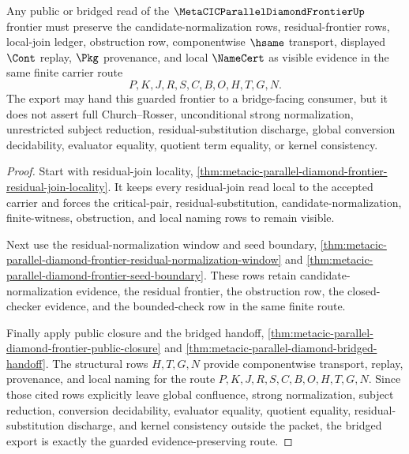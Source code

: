 \begin{theorem}
\label{thm:metacic-parallel-diamond-frontier-bridged-export}
Any public or bridged read of the $\MetaCICParallelDiamondFrontierUp$ frontier must preserve the candidate-normalization rows, residual-frontier rows, local-join ledger, obstruction row, componentwise $\hsame$ transport, displayed $\Cont$ replay, $\Pkg$ provenance, and local $\NameCert$ as visible evidence in the same finite carrier route
$$
P,K,J,R,S,C,B,O,H,T,G,N.
$$
The export may hand this guarded frontier to a bridge-facing consumer, but it does not assert full Church--Rosser, unconditional strong normalization, unrestricted subject reduction, residual-substitution discharge, global conversion decidability, evaluator equality, quotient term equality, or kernel consistency.
\end{theorem}
\begin{proof}
Start with residual-join locality, \autoref{thm:metacic-parallel-diamond-frontier-residual-join-locality}. It keeps every residual-join read local to the accepted carrier and forces the critical-pair, residual-substitution, candidate-normalization, finite-witness, obstruction, and local naming rows to remain visible.

Next use the residual-normalization window and seed boundary, \autoref{thm:metacic-parallel-diamond-frontier-residual-normalization-window} and \autoref{thm:metacic-parallel-diamond-frontier-seed-boundary}. These rows retain candidate-normalization evidence, the residual frontier, the obstruction row, the closed-checker evidence, and the bounded-check row in the same finite route.

Finally apply public closure and the bridged handoff, \autoref{thm:metacic-parallel-diamond-frontier-public-closure} and \autoref{thm:metacic-parallel-diamond-bridged-handoff}. The structural rows $H,T,G,N$ provide componentwise transport, replay, provenance, and local naming for the route $P,K,J,R,S,C,B,O,H,T,G,N$. Since those cited rows explicitly leave global confluence, strong normalization, subject reduction, conversion decidability, evaluator equality, quotient equality, residual-substitution discharge, and kernel consistency outside the packet, the bridged export is exactly the guarded evidence-preserving route.
\end{proof}


